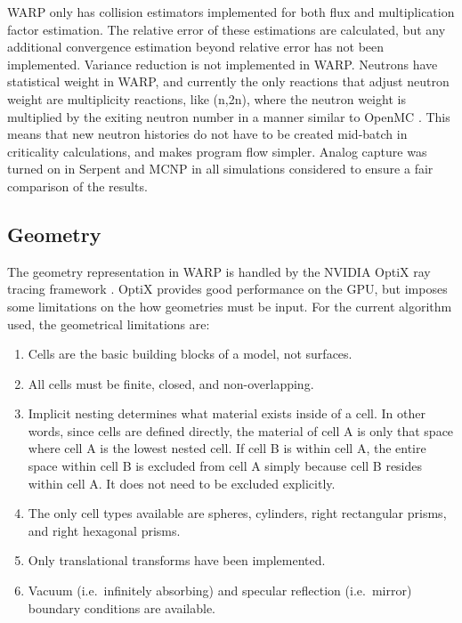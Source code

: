 \documentclass[preprint,12pt]{elsarticle}
\begin{document}
WARP only has collision estimators implemented for both flux and multiplication factor estimation.  The relative error of these estimations are calculated, but any additional convergence estimation beyond relative error has not been implemented.  Variance reduction is not implemented in WARP.  Neutrons have statistical weight in WARP, and currently the only reactions that adjust neutron weight are multiplicity reactions, like (n,2n), where the neutron weight is multiplied by the exiting neutron number in a manner similar to OpenMC \cite{openmc}.  This means that new neutron histories do not have to be created mid-batch in criticality calculations, and makes program flow simpler.  Analog capture was turned on in Serpent and MCNP in all simulations considered to ensure a fair comparison of the results.  

\subsection{Geometry}

The geometry representation in WARP is handled by the NVIDIA OptiX ray tracing framework \cite{optix}.  OptiX provides good performance on the GPU, but imposes some limitations on the how geometries must be input.  For the current algorithm used, the geometrical limitations are:

\begin{enumerate}
\item Cells are the basic building blocks of a model, not surfaces.
\item All cells must be finite, closed, and non-overlapping.
\item Implicit nesting determines what material exists inside of a cell.  In other words, since cells are defined directly, the material of cell A is only that space where cell A is the lowest nested cell.  If cell B is within cell A, the entire space within cell B is excluded from cell A simply because cell B resides within cell A.  It does not need to be excluded explicitly.
\item The only cell types available are spheres, cylinders, right rectangular prisms, and right hexagonal prisms.
\item Only translational transforms have been implemented.
\item Vacuum (i.e.\ infinitely absorbing) and specular reflection  (i.e.\ mirror) boundary conditions are available.
\end{enumerate}
\end{document}
